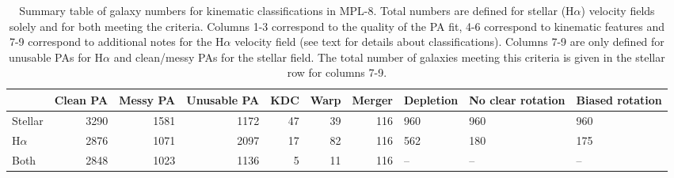 \documentclass[fleqn,usenatbib]{mnras}
\begin{document}
\begin{table}
\begin{tabular}{lrrrrrrlll}
\hline
&  Clean PA &  Messy PA &  Unusable PA &  KDC &  Warp &  Merger & Depletion & No clear rotation & Biased rotation \\
\hline
Stellar &      3290 &      1581 &         1172 &   47 &    39 &     116 &       960 &               960 &             960 \\
H$\alpha$ &      2876 &      1071 &         2097 &   17 &    82 &     116 &       562 &               180 &             175 \\
Both &      2848 &      1023 &         1136 &    5 &    11 &     116 &        -- &                -- &              -- \\
\end{tabular}
\caption{Summary table of galaxy numbers for kinematic classifications in  MPL-8. Total numbers are defined for stellar (H$\alpha$) velocity fields solely and for both meeting the criteria. Columns 1-3 correspond to the quality of the PA fit, 4-6 correspond to kinematic features and 7-9 correspond to additional notes for the H$\alpha$ velocity field (see text for details about classifications). Columns 7-9 are only defined for unusable PAs for H$\alpha$ and clean/messy PAs for the stellar field. The total number of galaxies meeting this criteria is given in the stellar row for columns 7-9.}
\label{tab:kin_class}
\end{table}
\end{document}
